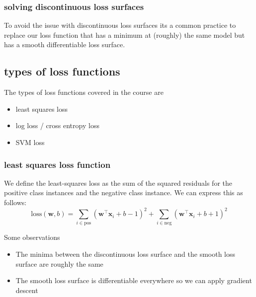 \documentclass[12pt]{article}
\theoremstyle{definition}
\begin{document}
\subsubsection*{solving discontinuous loss surfaces}

To avoid the issue with discontinuous loss surfaces its a common practice to replace our loss function that has a minimum at (roughly) the same model but has a smooth differentiable loss surface.

\subsection{types of loss functions}

The types of loss functions covered in the course are 
\begin{itemize}[leftmargin=*, noitemsep]
    \item least squares loss
    \item log loss / cross entropy loss
    \item SVM loss
\end{itemize}

\subsubsection*{least squares loss function}


We define the least-squares loss as the sum of the squared residuals for the positive class instances and the negative class instance. We can express this as follows: 
\begin{equation}
    \text{loss}(\mathbf{w}, b) = \sum_{i \in \text{pos}} {(\mathbf{w}^\intercal\mathbf{x}_i+b-1)}^2 + \sum_{i \in \text{neg}} {(\mathbf{w}^\intercal\mathbf{x}_i+b+1)}^2
\end{equation}

Some observations 
\begin{itemize}[leftmargin=*, noitemsep]
    \item The minima between the discontinuous loss surface and the smooth loss surface are roughly the same
    \item The smooth loss surface is differentiable everywhere so we can apply gradient descent
\end{itemize}
\end{document}
